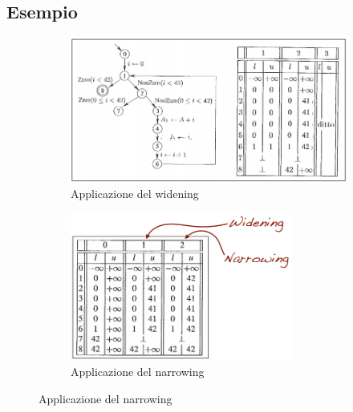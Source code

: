 \documentclass[a4paper,oneside,titlepage]{book}
\begin{document}
\subsection{Esempio}
\label{int5}
\begin{figure}[htp]
	\begin{subfigure}{0.49\textwidth}
	    \centering
		\includegraphics[width=\textwidth, height=\textheight, keepaspectratio]{widening.png}
		\caption{Applicazione del widening}
	\end{subfigure}
	\hfill
	\begin{subfigure}{0.49\textwidth}
	    \centering
		\includegraphics[width=0.8\textwidth]{narrowing.png} 
		\caption{Applicazione del narrowing}
	\end{subfigure}
\end{figure}

\newpage
\end{document}
